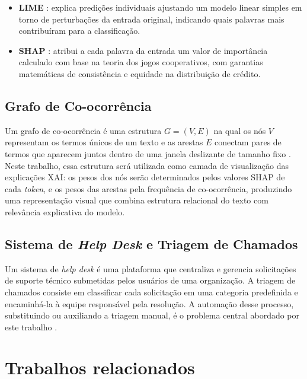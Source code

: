 \documentclass[
    12pt,                %
    openright,           %
    oneside,             %
    a4paper,             %
    english,             %
    brazil               %
]{abntex2}
\begin{document}
\begin{itemize}
    \item \textbf{LIME} \cite{ribeiro2016}: explica predições individuais ajustando um modelo linear simples em torno de perturbações da entrada original, indicando quais palavras mais contribuíram para a classificação.
 
    \item \textbf{SHAP} \cite{lundberg2017}: atribui a cada palavra da entrada um valor de importância calculado com base na teoria dos jogos cooperativos, com garantias matemáticas de consistência e equidade na distribuição de crédito.
\end{itemize}
 
\subsection{Grafo de Co-ocorrência}
 
Um grafo de co-ocorrência é uma estrutura $G = (V, E)$ na qual os nós $V$ representam os termos únicos de um texto e as arestas $E$ conectam pares de termos que aparecem juntos dentro de uma janela deslizante de tamanho fixo \cite{yao2019}. Neste trabalho, essa estrutura será utilizada como camada de visualização das explicações XAI: os pesos dos nós serão determinados pelos valores SHAP de cada \textit{token}, e os pesos das arestas pela frequência de co-ocorrência, produzindo uma representação visual que combina estrutura relacional do texto com relevância explicativa do modelo.
 
\subsection{Sistema de \textit{Help Desk} e Triagem de Chamados}
 
Um sistema de \textit{help desk} é uma plataforma que centraliza e gerencia solicitações de suporte técnico submetidas pelos usuários de uma organização. A triagem de chamados consiste em classificar cada solicitação em uma categoria predefinida e encaminhá-la à equipe responsável pela resolução. A automação desse processo, substituindo ou auxiliando a triagem manual, é o problema central abordado por este trabalho \cite{zemp2021}.

\section{Trabalhos relacionados}
\label{sec:trabalhos_relacionados}
\end{document}
